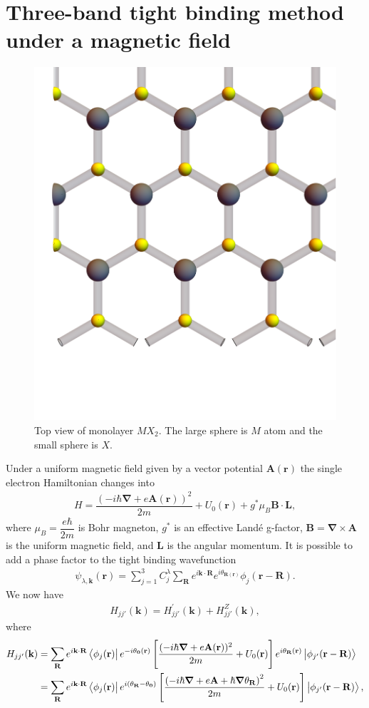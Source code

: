 \documentclass{report}
\newcommand{\f}[2]{\dfrac{#1}{#2}}
\begin{document}
\section{Three-band tight binding method under a magnetic field}
\begin{figure}[htb]
	\centering
	\includegraphics[width=0.5\linewidth,height=0.5\linewidth]{pic/lattice.pdf}
	\caption{\label{fig:Lattice} Top view of monolayer $MX_{2}$. The large sphere is $M$ atom and the small sphere is $X$.}
\end{figure}
Under a uniform magnetic field given by a vector potential $\mathbf{A}(\mathbf{r})$ the single electron Hamiltonian changes into
\begin{align}
	H = \f{\left(-i\hbar \boldsymbol{\nabla} + e \mathbf{A(r)}\right)^{2}}{2m} + U_{0}(\mathbf{r}) + g^{*} \mu_{B} \mathbf{B} \cdot \mathbf{L},
\end{align}
where $\mu_{B} = \f{e\hbar}{2m}$ is Bohr magneton, $g^{*}$ is an effective Landé g-factor, $\mathbf{B} = \boldsymbol{\nabla} \times  \mathbf{A}$ is the uniform magnetic field, and $\mathbf{L}$ is the angular momentum. It is possible to add a phase factor to the tight binding wavefunction
\begin{align}
	\psi_{\lambda,\mathbf{k}} (\mathbf{r}) = \sum_{j=1}^{3} C_{j}^{\lambda} \sum_{\mathbf{R}} e^{i\mathbf{k \cdot R}} e^{i \theta_{\mathbf{R}(\mathbf{r})}} \phi_{j}(\mathbf{r} - \mathbf{R}).
\end{align}
We now have
\begin{align}
	H_{j j'} (\mathbf{k}) = H_{jj'}^{'}(\mathbf{k}) + H_{jj'}^{Z}(\mathbf{k}),
\end{align}
where
\begin{align}
	H_{jj'}(\mathbf{k})
	 & = \sum_{\mathbf{R}} e^{i\mathbf{k \cdot R}} \bra{\phi_{j}(\mathbf{r})} e^{-i \theta_{\mathbf{0}}(\mathbf{r})} \left[\f{(-i\hbar \boldsymbol{\nabla} + e \mathbf{A}(\mathbf{r}))^{2}}{2m} + U_{0}(\mathbf{r}) \right] e^{i \theta_{\mathbf{R}}(\mathbf{r})} \ket{\phi_{j'}(\mathbf{r - R})}\nonumber                  \\
	 & = \sum_{\mathbf{R}} e^{i\mathbf{k \cdot R}} \bra{\phi_{j}(\mathbf{r})} e^{i(\theta_{\mathbf{R}} - \theta_{\mathbf{0}} )} \left[ \f{ \left( -i\hbar \boldsymbol{\nabla} + e \mathbf{A} + \hbar \boldsymbol{\nabla} \theta_{\mathbf{R}} \right)^{2} }{2m} + U_{0}(\mathbf{r}) \right] \ket{\phi_{j'}(\mathbf{r - R})},
\end{align}
\end{document}
